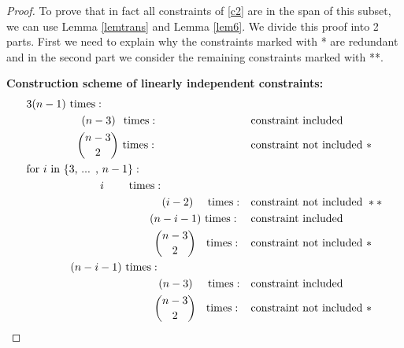 \begin{proof}
	To prove that in fact all constraints of \ref{c2} are in the span of this subset, we can use Lemma \ref{lemtrans} and Lemma \ref{lem6}. We divide this proof into 2 parts. First we need to explain why the constraints marked with * are redundant and in the second part we consider the remaining constraints marked with **.
	
	\newpage
	\textbf{Construction scheme of linearly independent constraints:}
	\begin{align*}
	&\text{$3(n-1)$ times}: && \\
	&\hspace{50 pt} \text{$(n-3)$ \hspace{0.5 pt} times}:		&&\text{constraint included } \\
	&\hspace{46 pt} \binom{n-3}{2}\text{ times}:	&&\text{constraint not included }* \\
	&\text{for $i$ in \{$3$, ... , $n-1$\}}: && \\
	&\hspace{67 pt}\text{$i$ \hspace{16 pt} times}: && \\
	&\hspace{123 pt}\text{$(i-2)$ \hspace{6.5 pt} times}: &&\text{constraint not included }** \\
	&\hspace{112 pt}\text{$(n-i-1)$ times}:		&&\text{constraint included } \\
	&\hspace{116 pt}\binom{n-3}{2}\text{\hspace{6 pt} times}:	&&\text{constraint not included }* \\
	&\hspace{40 pt}\text{$(n-i-1)$ times}: && \\
	&\hspace{120 pt}\text{$(n-3)$\hspace{10.5 pt} times}:		&&\text{constraint included } \\
	&\hspace{116 pt}\binom{n-3}{2}\text{\hspace{6 pt} times}:	&&\text{constraint not included }*
	\end{align*}
	
%	
	

\end{proof}
